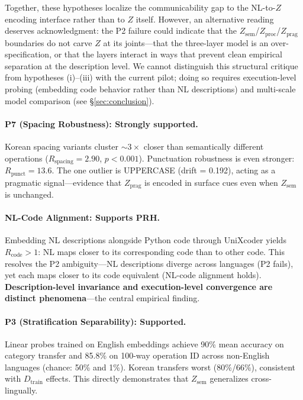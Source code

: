 \documentclass[11pt]{article}
\theoremstyle{definition}
\newcommand{\Zsem}{Z_{\text{sem}}}
\newcommand{\Zproc}{Z_{\text{proc}}}
\newcommand{\Zprag}{Z_{\text{prag}}}
\newcommand{\Dtrain}{D_{\text{train}}}
\begin{document}
Together, these hypotheses localize the communicability gap to the NL-to-$Z$ encoding interface rather than to $Z$ itself. However, an alternative reading deserves acknowledgment: the P2 failure could indicate that the $\Zsem$/$\Zproc$/$\Zprag$ boundaries do not carve $Z$ at its joints---that the three-layer model is an over-specification, or that the layers interact in ways that prevent clean empirical separation at the description level. We cannot distinguish this structural critique from hypotheses (i)--(iii) with the current pilot; doing so requires execution-level probing (embedding code behavior rather than NL descriptions) and multi-scale model comparison (see \S\ref{sec:conclusion}).

\paragraph{P7 (Spacing Robustness): Strongly supported.}
Korean spacing variants cluster ${\sim}3\times$ closer than semantically different operations ($R_{\text{spacing}} = 2.90$, $p < 0.001$). Punctuation robustness is even stronger: $R_{\text{punct}} = 13.6$. The one outlier is UPPERCASE (drift = 0.192), acting as a pragmatic signal---evidence that $\Zprag$ is encoded in surface cues even when $\Zsem$ is unchanged.

\paragraph{NL-Code Alignment: Supports PRH.}
Embedding NL descriptions alongside Python code through UniXcoder yields $R_{\text{code}} > 1$: NL maps closer to its corresponding code than to other code. This resolves the P2 ambiguity---NL descriptions diverge across languages (P2 fails), yet each maps closer to its code equivalent (NL-code alignment holds). \textbf{Description-level invariance and execution-level convergence are distinct phenomena}---the central empirical finding.

\paragraph{P3 (Stratification Separability): Supported.}
Linear probes trained on English embeddings achieve 90\% mean accuracy on category transfer and 85.8\% on 100-way operation ID across non-English languages (chance: 50\% and 1\%). Korean transfers worst (80\%/66\%), consistent with $\Dtrain$ effects. This directly demonstrates that $\Zsem$ generalizes cross-lingually.
\end{document}
